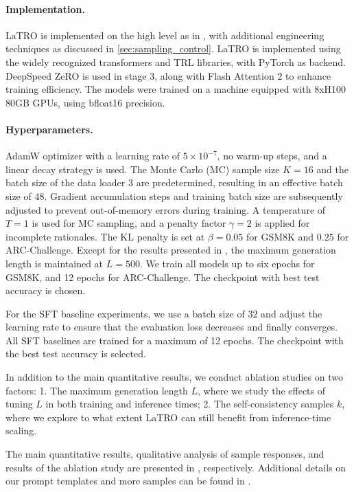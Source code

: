 \paragraph{Implementation.} LaTRO is implemented on the high level as in , with additional engineering techniques as discussed in \cref{sec:sampling_control}. LaTRO is implemented using the widely recognized transformers \citep{wolf-etal-2020-transformers} and TRL \citep{vonwerra2022trl} libraries, with PyTorch \citep{Ansel2024PyTorch2F} as backend. DeepSpeed ZeRO \citep{DBLP:conf/kdd/RasleyRRH20} is used in stage 3, along with Flash Attention 2 \citep{DBLP:conf/nips/DaoFERR22} to enhance training efficiency. The models were trained on a machine 
 equipped with 8xH100 80GB GPUs, using bfloat16 precision. %
\paragraph{Hyperparameters.} AdamW optimizer with a learning rate of $5\times 10^{-7}$, no warm-up steps, and a linear decay strategy is used. The Monte Carlo (MC) sample size $K=16$ and the batch size of the data loader $3$ are predetermined, resulting in an effective batch size of $48$. Gradient accumulation steps and training batch size are subsequently adjusted to prevent out-of-memory errors during training.
A temperature of $T=1$ is used for MC sampling, and a penalty factor $\gamma=2$ is applied for incomplete rationales. The KL penalty is set at $\beta=0.05$ for GSM8K and $0.25$ for ARC-Challenge. Except for the results presented in , the maximum generation length is maintained at $L=500$. We train all models up to six epochs for GSM8K, and 12 epochs for ARC-Challenge. The checkpoint with best test accuracy is chosen.

For the SFT baseline experiments, we use a batch size of $32$ and adjust the learning rate to ensure that the evaluation loss decreases and finally converges. All SFT baselines are trained for a maximum of 12 epochs. The checkpoint with the best test accuracy is selected. 

In addition to the main quantitative results, we conduct ablation studies on two factors: 1. The maximum generation length $L$, where we study the effects of tuning $L$ in both training and inference times; 2. The self-consistency samples $k$, where we explore to what extent LaTRO can still benefit from inference-time scaling.

The main quantitative results, qualitative analysis of sample responses, and results of the ablation study are presented in , respectively. Additional details on our prompt templates and more samples can be found in .

